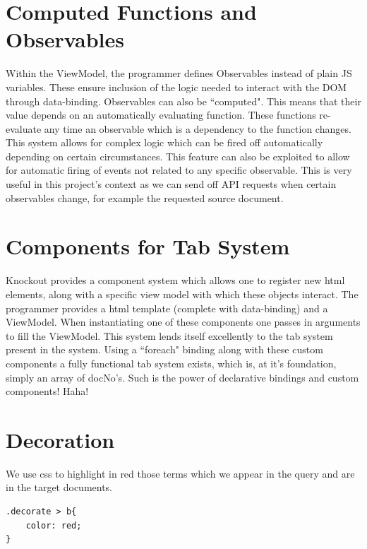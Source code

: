 \documentclass{l4proj}
\begin{document}
\section{Computed Functions and Observables}
Within the ViewModel, the programmer defines Observables instead of plain JS variables. These ensure inclusion of the logic needed to interact with the DOM through data-binding. Observables can also be ``computed". This means that their value depends on an automatically evaluating function. These functions re-evaluate any time an observable which is a dependency to the function changes. This system allows for complex logic which can be fired off automatically depending on certain circumstances.
This feature can also be exploited to allow for automatic firing of events not related to any specific observable. This is very useful in this project's context as we can send off API requests when certain observables change, for example the requested source document.

\section{Components for Tab System}
Knockout provides a component system which allows one to register new html elements, along with a specific view model with which these objects interact. The programmer provides a html template (complete with data-binding) and a ViewModel. When instantiating one of these components one passes in arguments to fill the ViewModel.
This system lends itself excellently to the tab system present in the system. Using a ``foreach" binding along with these custom components a fully functional tab system exists, which is, at it's foundation, simply an array of docNo's. Such is the power of declarative bindings and custom components! Haha!

\section{Decoration}
We use css to highlight in red those terms which we appear in the query and are in the target documents. 
\begin{verbatim}
.decorate > b{
    color: red;
}
\end{verbatim}
\end{document}
